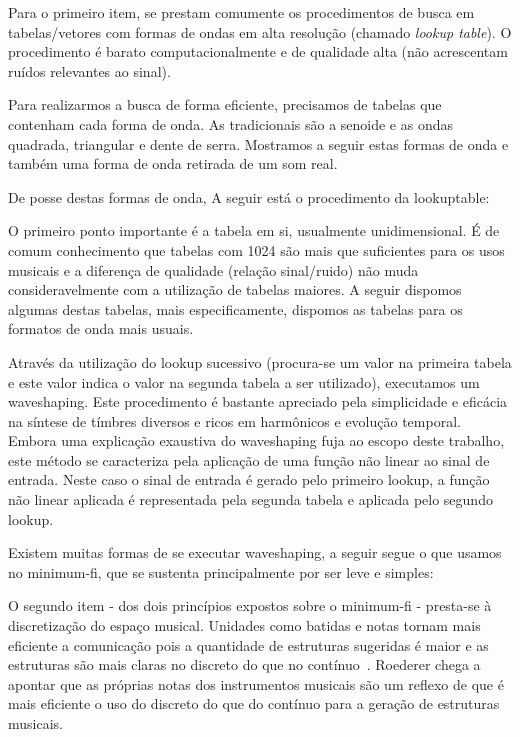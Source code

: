 Para o primeiro item, se prestam comumente os procedimentos de busca
em tabelas/vetores com formas de ondas em alta resolução (chamado
\emph{lookup table}). O procedimento é barato computacionalmente e de
qualidade alta (não acrescentam ruídos relevantes ao sinal).

Para realizarmos a busca de forma eficiente, precisamos de tabelas que
contenham cada forma de onda. As tradicionais são a senoide e
as ondas quadrada, triangular e dente de serra.  Mostramos a seguir
estas formas de onda e também uma forma de onda retirada de um som
real.

De posse destas formas de onda, A seguir está o procedimento da
lookuptable:


O primeiro ponto importante é a tabela em si, usualmente
unidimensional. É de comum conhecimento que tabelas com 1024 são mais
que suficientes para os usos musicais e a diferença de qualidade
(relação sinal/ruido) não muda consideravelmente com a utilização de
tabelas maiores. A seguir dispomos algumas destas tabelas, mais
especificamente, dispomos as tabelas para os formatos de onda mais
usuais.


Através da utilização do lookup sucessivo (procura-se um valor na primeira tabela
e este valor indica o valor na segunda tabela a ser utilizado), executamos
um waveshaping. Este procedimento é bastante apreciado pela simplicidade e eficácia
na síntese de tímbres diversos e ricos em harmônicos e evolução temporal. Embora
uma explicação exaustiva do waveshaping fuja ao escopo deste trabalho, este
método se caracteriza pela aplicação de uma função não linear ao sinal de entrada.
Neste caso o sinal de entrada é gerado pelo primeiro lookup, a função não linear aplicada
é representada pela segunda tabela e aplicada pelo segundo lookup.

Existem muitas formas de se executar waveshaping, a seguir segue o que usamos no minimum-fi, que se sustenta principalmente por ser leve e simples:


O segundo item - dos dois princípios expostos sobre o minimum-fi - presta-se à discretização do espaço musical. Unidades como batidas e notas
tornam mais eficiente a comunicação pois a quantidade
de estruturas sugeridas é maior e as estruturas são mais claras no discreto do que no contínuo~\cite{Roederer}. Roederer chega a
apontar que as próprias notas dos instrumentos musicais são um reflexo de que é mais eficiente
o uso do discreto do que do contínuo para a geração de estruturas musicais.

